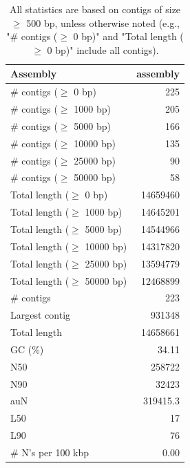 \documentclass[12pt,a4paper]{article}
\begin{document}
\begin{table}[ht]
\begin{center}
\caption{All statistics are based on contigs of size $\geq$ 500 bp, unless otherwise noted (e.g., "\# contigs ($\geq$ 0 bp)" and "Total length ($\geq$ 0 bp)" include all contigs).}
\begin{tabular}{|l*{1}{|r}|}
\hline
Assembly & assembly \\ \hline
\# contigs ($\geq$ 0 bp) & 225 \\ \hline
\# contigs ($\geq$ 1000 bp) & 205 \\ \hline
\# contigs ($\geq$ 5000 bp) & 166 \\ \hline
\# contigs ($\geq$ 10000 bp) & 135 \\ \hline
\# contigs ($\geq$ 25000 bp) & 90 \\ \hline
\# contigs ($\geq$ 50000 bp) & 58 \\ \hline
Total length ($\geq$ 0 bp) & 14659460 \\ \hline
Total length ($\geq$ 1000 bp) & 14645201 \\ \hline
Total length ($\geq$ 5000 bp) & 14544966 \\ \hline
Total length ($\geq$ 10000 bp) & 14317820 \\ \hline
Total length ($\geq$ 25000 bp) & 13594779 \\ \hline
Total length ($\geq$ 50000 bp) & 12468899 \\ \hline
\# contigs & 223 \\ \hline
Largest contig & 931348 \\ \hline
Total length & 14658661 \\ \hline
GC (\%) & 34.11 \\ \hline
N50 & 258722 \\ \hline
N90 & 32423 \\ \hline
auN & 319415.3 \\ \hline
L50 & 17 \\ \hline
L90 & 76 \\ \hline
\# N's per 100 kbp & 0.00 \\ \hline
\end{tabular}
\end{center}
\end{table}
\end{document}
